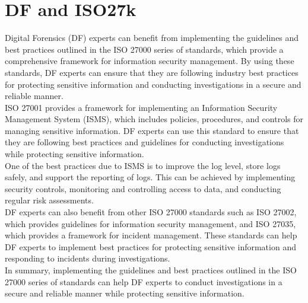 \documentclass{scrreprt}
\begin{document}
\section{DF and ISO27k}
Digital Forensics (DF) experts can benefit from implementing the guidelines and best practices outlined in the ISO 27000 series of standards, which provide a comprehensive framework for information security management. By using these standards, DF experts can ensure that they are following industry best practices for protecting sensitive information and conducting investigations in a secure and reliable manner.
\\\linebreak ISO 27001 provides a framework for implementing an Information Security Management System (ISMS), which includes policies, procedures, and controls for managing sensitive information. DF experts can use this standard to ensure that they are following best practices and guidelines for conducting investigations while protecting sensitive information.
\\\linebreak One of the best practices due to ISMS is to improve the log level, store logs safely, and support the reporting of logs. This can be achieved by implementing security controls, monitoring and controlling access to data, and conducting regular risk assessments.
\\\linebreak DF experts can also benefit from other ISO 27000 standards such as ISO 27002, which provides guidelines for information security management, and ISO 27035, which provides a framework for incident management. These standards can help DF experts to implement best practices for protecting sensitive information and responding to incidents during investigations.
\\\linebreak In summary, implementing the guidelines and best practices outlined in the ISO 27000 series of standards can help DF experts to conduct investigations in a secure and reliable manner while protecting sensitive information.
\end{document}
